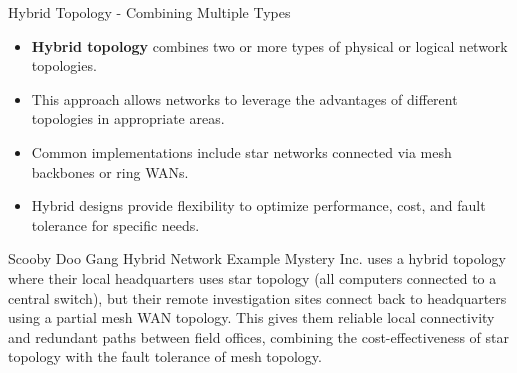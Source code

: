 \documentclass[aspectratio=169]{beamer}
\begin{document}
	\begin{frame}{Hybrid Topology - Combining Multiple Types}
		\begin{itemize}
			\item \textbf{Hybrid topology} combines two or more types of physical or logical network topologies.
			\item This approach allows networks to leverage the advantages of different topologies in appropriate areas.
			\item Common implementations include star networks connected via mesh backbones or ring WANs.
			\item Hybrid designs provide flexibility to optimize performance, cost, and fault tolerance for specific needs.
		\end{itemize}
		
		\begin{exampleblock}{Scooby Doo Gang Hybrid Network Example}
			Mystery Inc. uses a hybrid topology where their local headquarters uses star topology (all computers connected to a central switch), but their remote investigation sites connect back to headquarters using a partial mesh WAN topology. This gives them reliable local connectivity and redundant paths between field offices, combining the cost-effectiveness of star topology with the fault tolerance of mesh topology.
		\end{exampleblock}
	\end{frame}
	
\end{document}
